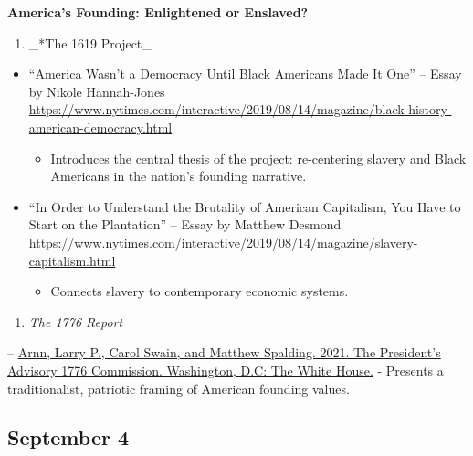 \documentclass[]{tufte-handout}
\providecommand{\tightlist}{%
  \setlength{\itemsep}{0pt}\setlength{\parskip}{0pt}}
\begin{document}
\textbf{America's Founding: Enlightened or Enslaved?}

\begin{enumerate}
\def\labelenumi{\arabic{enumi}.}
\tightlist
\item
  \_*The 1619 Project\_
\end{enumerate}

\begin{itemize}
\tightlist
\item
  ``America Wasn't a Democracy Until Black Americans Made It One'' --
  Essay by Nikole Hannah-Jones
  \url{https://www.nytimes.com/interactive/2019/08/14/magazine/black-history-american-democracy.html}

  \begin{itemize}
  \tightlist
  \item
    Introduces the central thesis of the project: re-centering slavery
    and Black Americans in the nation's founding narrative.
  \end{itemize}
\item
  ``In Order to Understand the Brutality of American Capitalism, You
  Have to Start on the Plantation'' -- Essay by Matthew Desmond
  \url{https://www.nytimes.com/interactive/2019/08/14/magazine/slavery-capitalism.html}

  \begin{itemize}
  \tightlist
  \item
    Connects slavery to contemporary economic systems.
  \end{itemize}
\end{itemize}

\begin{enumerate}
\def\labelenumi{\arabic{enumi}.}
\setcounter{enumi}{1}
\tightlist
\item
  \emph{The 1776 Report}
\end{enumerate}

--
\href{https://trumpwhitehouse.archives.gov/wp-content/uploads/2021/01/The-Presidents-Advisory-1776-Commission-Final-Report.pdf}{Arnn,
Larry P., Carol Swain, and Matthew Spalding. 2021. The President's
Advisory 1776 Commission. Washington, D.C: The White House.} - Presents
a traditionalist, patriotic framing of American founding values.

\hypertarget{september-4}{%
\subsection{September 4}\label{september-4}}
\end{document}

